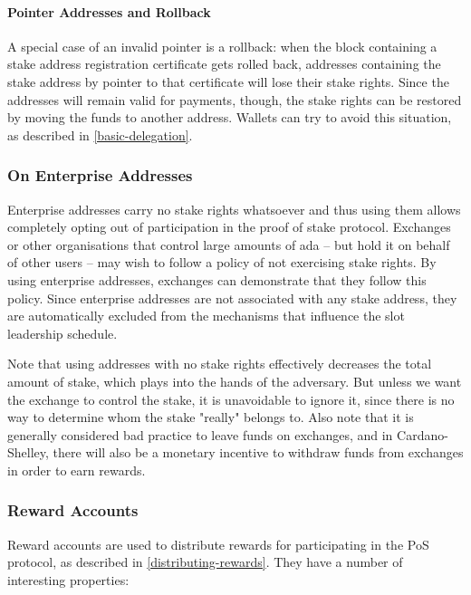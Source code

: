 \documentclass[11pt,a4paper,dvipsnames,twosided]{article}
\begin{document}
\paragraph{Pointer Addresses and Rollback}
A special case of an invalid pointer is a rollback: when the block containing a
stake address registration certificate gets rolled back, addresses containing
the stake address by pointer to that certificate will lose their stake rights.
Since the addresses will remain valid for payments, though, the stake rights can
be restored by moving the funds to another address. Wallets can try to avoid
this situation, as described in \cref{basic-delegation}.

\subsubsection{On Enterprise Addresses}
\label{enterprise-address}

Enterprise addresses carry no stake rights whatsoever and thus using
them allows completely opting out of participation in the proof of stake
protocol. Exchanges or other organisations that control large amounts of
ada -- but hold it on behalf of other users -- may wish to follow a
policy of not exercising stake rights. By using enterprise addresses,
exchanges can demonstrate that they follow this policy.
Since enterprise addresses are not associated with any stake address, they
are automatically excluded from the mechanisms that influence the slot
leadership schedule.

Note that using addresses with no stake rights effectively decreases
the total amount of stake, which plays into the hands of the adversary.
But unless we want the exchange to control the stake, it is unavoidable to
ignore it, since there is no way to determine whom the stake "really" belongs
to. Also note that it is generally considered bad practice to leave funds on
exchanges, and in Cardano-Shelley, there will also be a monetary incentive to
withdraw funds from exchanges in order to earn rewards.

\subsubsection{Reward Accounts}
\label{reward-address}

Reward accounts are used to distribute rewards for participating in
the PoS protocol, as described in
\ref{distributing-rewards}. They have a number of interesting
properties:
\end{document}
